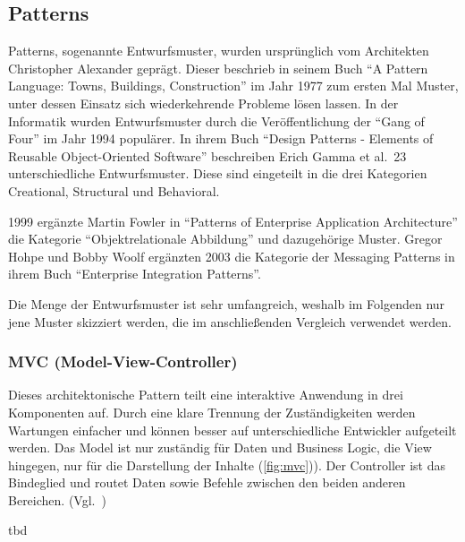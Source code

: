 \newpage

\subsection{Patterns}
Patterns, sogenannte Entwurfsmuster, wurden ursprünglich vom Architekten Christopher Alexander geprägt.
Dieser beschrieb in seinem Buch \enquote{A Pattern Language: Towns, Buildings, Construction}\cite{a-pattern-language} im Jahr 1977 zum ersten Mal Muster, unter dessen Einsatz sich wiederkehrende Probleme lösen lassen.
In der Informatik wurden Entwurfsmuster durch die Veröffentlichung der \enquote{Gang of Four} im Jahr 1994 populärer.
In ihrem Buch \enquote{Design Patterns - Elements of Reusable Object-Oriented Software}\cite{gamma-design-patterns} beschreiben Erich Gamma et al.\ 23 unterschiedliche Entwurfsmuster.
Diese sind eingeteilt in die drei Kategorien Creational, Structural und Behavioral.

1999 ergänzte Martin Fowler in \enquote{Patterns of Enterprise Application Architecture}\cite{patterns-of-enterprise-application-architecture} die Kategorie \enquote{Objektrelationale Abbildung} und dazugehörige Muster.
Gregor Hohpe und Bobby Woolf ergänzten 2003 die Kategorie der Messaging Patterns in ihrem Buch \enquote{Enterprise Integration Patterns}\cite{enterprise-integration-patterns}.

Die Menge der Entwurfsmuster ist sehr umfangreich, weshalb im Folgenden nur jene Muster skizziert werden, die im anschließenden Vergleich verwendet werden.

\subsubsection{MVC (Model-View-Controller)}
\color{red}
Dieses architektonische Pattern teilt eine interaktive Anwendung in drei Komponenten auf.
Durch eine klare Trennung der Zuständigkeiten werden Wartungen einfacher und können besser auf unterschiedliche Entwickler aufgeteilt werden.
Das Model ist nur zuständig für Daten und Business Logic, die View hingegen, nur für die Darstellung der Inhalte (\ref{fig:mvc})).
Der Controller ist das Bindeglied und routet Daten sowie Befehle zwischen den beiden anderen Bereichen.
(Vgl.~\cite{buschmann-pattern-oriented-software-architecture})

tbd
\color{black}

